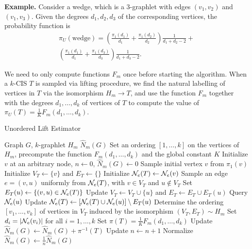 	\textbf{Example.} Consider a wedge, which is a 3-graphlet with edges $(v_1,v_2)$ and 
	$(v_1,v_3)$. Given the degrees $d_1, d_2, d_3$ of the corresponding 
	vertices, the probability function is
	\begin{multline}
	\label{prob:wedge}
		\pi_U(\mathrm{wedge}) = \left( \frac{\pi_1(d_1)}{d_1} + \frac{\pi_1(d_2)}{d_2}\right) \frac{1}{d_1+d_2-2} +\\
		\left( \frac{\pi_1(d_1)}{d_1} + \frac{\pi_1(d_3)}{d_3}\right) \frac{1}{d_1+d_3-2}.
	\end{multline}

	We need to only compute functions $F_m$ once before starting the algorithm.
	When a $k$-CIS $T$ is sampled via lifting procedure, we find the natural labelling of vertices in $T$ via the isomorphism $H_m \rightarrow T$, and use the function $F_m$ together with the degrees $d_1,\ldots,d_k$ of vertices of $T$ to compute the value of 
	$\pi_U(T) = \frac{1}{K} F_{m}(d_1,\ldots,d_k)$.
	
	
\begin{algorithm}[h]
\label{alg:ULE}
\caption{Unordered Lift Estimator}
\begin{algorithmic}
    \INPUT Graph $G$, $k$-graphlet $H_m$
    \OUTPUT $\hat N_m(G)$
    \STATE Set an ordering $[1,\ldots, k]$ on the vertices of $H_m$, precompute the function $F_m(d_1,\ldots, d_k)$ and the global constant $K$
    \STATE Initialize $v$ at an arbitrary node, $n \gets 0$, $\hat N_m(G) \gets 0$
        \STATE Sample initial vertex $v$ from $\pi_1(v)$
        \STATE Initialize $V_T \gets \{v\}$ and $E_T \gets \{\}$
        \STATE Initialize $\mathcal{N}_e(T)\gets \mathcal{N}_e(v)$
            \STATE Sample an edge $e=(v,u)$ uniformly from $\mathcal{N}_e(T)$, with $v\in V_T$ and $u\notin V_T$
            \STATE Set $E_T(u) \gets \{(v,u)\in \mathcal{N}_e(T)\}$
            \STATE Update $V_T\gets V_T\cup\{u\}$ and $E_T \gets E_T \cup E_T(u)$
            \STATE Query $\mathcal{N}_e(u)$
            \STATE Update $\mathcal{N}_e(T) \gets [\mathcal{N}_e(T)\cup\mathcal{N}_e(u)]\setminus E_T(u)$
        \ENDWHILE
            \STATE Determine the ordering $[v_1,\ldots,v_k]$ of vertices in $V_T$ induced by the isomorphism $(V_T, E_T)\sim H_m$
            \STATE Set $d_i = |\mathcal{N}_e(v_i)|$ for all $i=1,\ldots, k$
            \STATE Set $\pi(T) = \frac{1}{K}F_m(d_1,\ldots,d_k)$
            \STATE Update $\hat N_m(G) \gets \hat N_m(G) + \pi^{-1}(T)$
        \ENDIF
       \STATE Update $n \gets n + 1$
    \ENDWHILE
    \STATE Normalize $\hat N_m(G) \gets \frac{1}{n}\hat N_m(G)$
\end{algorithmic}
\end{algorithm}

